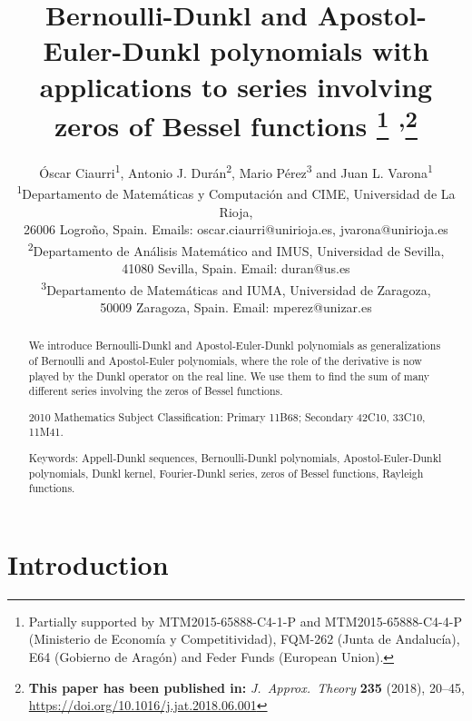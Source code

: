 \documentclass[10pt,a4paper]{article}
\title{Bernoulli-Dunkl and Apostol-Euler-Dunkl polynomials
with applications to series involving zeros of Bessel functions%
\footnote{Partially supported by MTM2015-65888-C4-1-P and MTM2015-65888-C4-4-P (Minis\-te\-rio de Eco\-no\-m\'ia y Com\-pe\-ti\-ti\-vi\-dad),
FQM-262 (Junta de Anda\-lu\-c\'ia), E64 (Gobier\-no de Ara\-g\'on) and Feder Funds (European Union).} 
\textsuperscript{,}\thanks{\textbf{This paper has been published in:} \textit{J.\ Approx.\ Theory} \textbf{235} (2018), 20--45, \url{https://doi.org/10.1016/j.jat.2018.06.001}}}
\author{\'Oscar Ciaurri\textsuperscript{1}, Antonio J. Dur\'an\textsuperscript{2}, Mario P\'erez\textsuperscript{3} and Juan L. Varona\textsuperscript{1}\\[6pt]
\small\textsuperscript{1}Departamento de Matem\'aticas y Computaci\'on and CIME,
Universidad de La Rioja,\\[-2pt]
\small 26006 Logro\~no, Spain. Emails: {oscar.ciaurri@unirioja.es}, {jvarona@unirioja.es}\\[6pt]
\small\textsuperscript{2}Departamento de An\'alisis Matem\'atico and IMUS,
Universidad de Sevilla,\\[-2pt]
\small 41080 Sevilla, Spain. Email: {duran@us.es}\\[6pt]
\small\textsuperscript{3}Departamento de Matem\'aticas and IUMA,
Universidad de Zaragoza,\\[-2pt]
\small 50009 Zaragoza, Spain. Email: {mperez@unizar.es}}
\date{}
\theoremstyle{plain}
\theoremstyle{definition}
\numberwithin{equation}{section} %
\begin{document}


\maketitle

\begin{abstract}
We introduce Bernoulli-Dunkl and Apostol-Euler-Dunkl polynomials as generalizations of Bernoulli and Apostol-Euler polynomials,
where the role of the derivative is now played by the Dunkl operator on the real line. We use them to find the sum of many different series involving the zeros of Bessel functions.

2010 Mathematics Subject Classification: Primary 11B68; Secondary 42C10, 33C10, 11M41.

Keywords: Appell-Dunkl sequences, Bernoulli-Dunkl polynomials, Apostol-Euler-Dunkl polynomials,
Dunkl kernel, Fourier-Dunkl series, zeros of Bessel functions, Rayleigh functions.
\end{abstract}

\section{Introduction}
\end{document}
